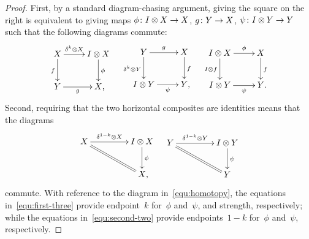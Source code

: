 \documentclass[reqno,10pt,a4paper,oneside,draft]{amsart}
\begin{document}
{{\begin{proof}
First, by a standard diagram-chasing argument, giving the square on the right is equivalent to giving maps $\phi \colon I \otimes X \to X$, $g \colon Y \to X$, $\psi \colon I \otimes Y \to Y$ such that the following diagrams commute:
\begin{align} \label{equ:first-three}
\begin{gathered}
\xymatrix{
  X
  \ar[r]^-{\kcyl \otimes X}
  \ar[d]_f
&
  \interval \otimes X
  \ar[d]^{\phi}
\\
  Y \ar[r]_-{g}
&
  X
\rlap{,}}
\end{gathered}
&&
\begin{gathered}
\xymatrix{
  Y
  \ar[r]^-g
  \ar[d]_{\kcyl \otimes Y}
&
  X
  \ar[d]^f
\\
  \interval \otimes Y
  \ar[r]_-{\psi}
&
  Y
\rlap{,}}
\end{gathered}
&&
\begin{gathered}
\xymatrix{
  \interval \otimes X
  \ar[r]^-\phi
  \ar[d]_{I \otimes f}
&
  X
  \ar[d]^{f}
\\
  \interval \otimes Y
  \ar[r]_-{\psi}
&
  Y
\rlap{.}}
\end{gathered}
\end{align}
Second, requiring that the two horizontal composites are identities means that the diagrams
\begin{align} \label{equ:second-two}
\begin{gathered}
\xymatrix@C+2em{
  X
  \ar[r]^-{\kcylinv \otimes X}
  \ar@{=}[dr]
&
  \interval \otimes X
  \ar[d]^\phi
\\&
  X
\rlap{,}}
\end{gathered}
&&
\begin{gathered}
\xymatrix@C+2em{
  Y
  \ar[r]^-{\kcylinv \otimes Y}
  \ar@{=}[dr]
&
  \interval \otimes Y
  \ar[d]^{\psi}
\\&
  Y
}
\end{gathered}
\end{align}
commute.
With reference to the diagram in~\eqref{equ:homotopy}, the equations in~\eqref{equ:first-three} provide endpoint~$k$ for~$\phi$ and~$\psi$, and strength, respectively; while the equations in~\eqref{equ:second-two} provide endpoints~$1-k$ for~$\phi$ and~$\psi$, respectively.
\end{proof}


}}
\end{document}
